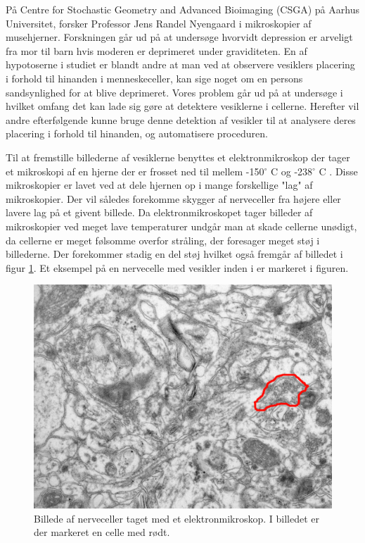 På Centre for Stochastic Geometry and Advanced Bioimaging (CSGA) på Aarhus Universitet, forsker Professor Jens Randel Nyengaard i mikroskopier af musehjerner. 
Forskningen går ud på at undersøge hvorvidt depression er arveligt fra mor til barn hvis moderen er deprimeret under graviditeten.
En af hypotoserne i studiet er blandt andre at man ved at observere vesiklers placering i forhold til hinanden i menneskeceller, kan sige noget om en persons sandsynlighed for at blive deprimeret. Vores problem går ud på at undersøge i hvilket omfang det kan lade sig gøre at detektere vesiklerne i cellerne.
Herefter vil andre efterfølgende kunne bruge denne detektion af vesikler til at analysere deres placering i forhold til hinanden, og automatisere proceduren.

Til at fremstille billederne af vesiklerne benyttes et elektronmikroskop der tager et mikroskopi af en hjerne der er frosset ned til mellem -150$^\circ$ C og -238$^\circ$ C . Disse mikroskopier er lavet ved at dele hjernen op i mange forskellige "lag" af mikroskopier.
Der vil således forekomme skygger af nerveceller fra højere eller lavere lag på et givent billede.
Da elektronmikroskopet tager billeder af mikroskopier ved meget lave temperaturer undgår man at skade cellerne unødigt, da cellerne er meget følsomme overfor stråling, der foresager meget støj i billederne. Der forekommer stadig en del støj hvilket også fremgår af billedet i figur \ref{fig:intro_celler}.
Et eksempel på en nervecelle med vesikler inden i er markeret i figuren. 
\begin{figure}[H]
	\centering
	\includegraphics[scale=0.5]{files/intro/img/celler2.png}
	\caption{Billede af nerveceller taget med et elektronmikroskop. I billedet er der markeret en celle med rødt.\label{fig:intro_celler}}
\end{figure}

